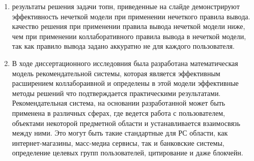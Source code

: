 \documentclass[a4paper,11pt]{proc}
\begin{document}
{\begin{enumerate}
	\item результаты решения задачи топн, приведенные на слайде демонстрируют
		эффективность нечеткой модели при применении нечеткого правила вывода.
		качество решения при применении правила вывода нечеткой модели ниже,
		чем при применении коллаборативного правила вывода в нечеткой модели,
		так как правило вывода задано аккуратно не для каждого пользователя.

	\item В ходе диссертационного исследовния была разработана
		математическая модель рекомендательной системы, которая
		является эффективным расширением коллабораивной и определены
		в этой модели эффективные методы решений что подтверждается
		практическими результатами. Рекомендательная система, на основании
		разработанной может быть применена в различных сферах, где
		ведется работа с пользователем, объектами некоторой предметной области
		и устанавливается взаимосвязь между ними. Это могут быть такие
		стандартные для РС области, как интернет-магазины, масс-медиа сервисы,
		так и банковские системы, определение целевых групп пользователей,
		цитирование и даже блокчейн.
\end{enumerate}
}
\end{document}

